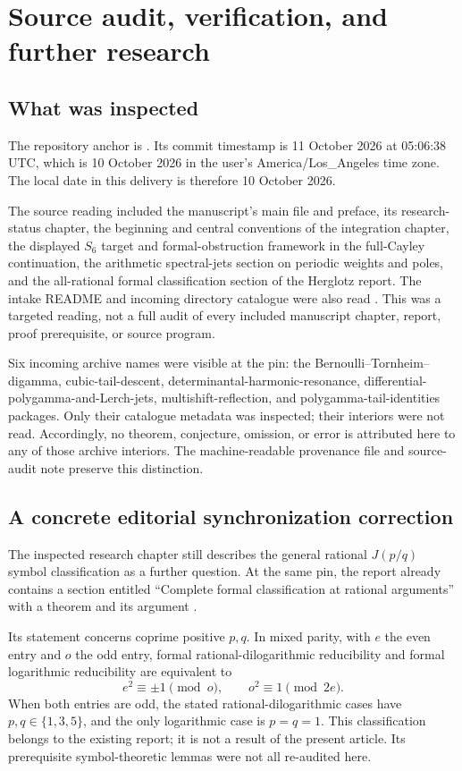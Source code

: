 \section{Source audit, verification, and further research}
\label{qspec:sec:audit}

\subsection{What was inspected}
The repository anchor is \qpin. Its commit timestamp is
11 October 2026 at 05:06:38 UTC, which is 10 October 2026 in the user's
America/Los\_Angeles time zone. The local date in this delivery is therefore
10 October 2026.

The source reading included the manuscript's main file and preface, its
research-status chapter, the beginning and central conventions of the
integration chapter, the displayed $S_6$ target and formal-obstruction
framework in the full-Cayley continuation, the arithmetic spectral-jets
section on periodic weights and poles, and the all-rational formal
classification section of the Herglotz report. The intake README and
incoming directory catalogue were also read \cite{repo,arithmetic,classification,intake}.
This was a targeted reading, not a full audit of every included manuscript
chapter, report, proof prerequisite, or source program.

Six incoming archive names were visible at the pin: the Bernoulli--Tornheim--
digamma, cubic-tail-descent, determinantal-harmonic-resonance,
differential-polygamma-and-Lerch-jets, multishift-reflection, and
polygamma-tail-identities packages. Only their catalogue metadata was
inspected; their interiors were not read. Accordingly, no theorem,
conjecture, omission, or error is attributed here to any of those archive
interiors. The machine-readable provenance file and source-audit note
preserve this distinction.

\subsection{A concrete editorial synchronization correction}
The inspected research chapter still describes the general rational
$J(p/q)$ symbol classification as a further question. At the same pin,
the report  already contains a
section entitled ``Complete formal classification at rational arguments''
with a theorem and its argument \cite{classification}.

Its statement concerns coprime positive $p,q$. In mixed parity, with
$e$ the even entry and $o$ the odd entry, formal rational-dilogarithmic
reducibility and formal logarithmic reducibility are equivalent to
\begin{equation}\label{qspec:eq:existing-J-status}
e^2\equiv\pm1\pmod o,\qquad o^2\equiv1\pmod{2e}.
\end{equation}
When both entries are odd, the stated rational-dilogarithmic cases have
$p,q\in\{1,3,5\}$, and the only logarithmic case is $p=q=1$.
This classification belongs to the existing report; it is not a result
of the present article. Its prerequisite symbol-theoretic lemmas were
not all re-audited here.


